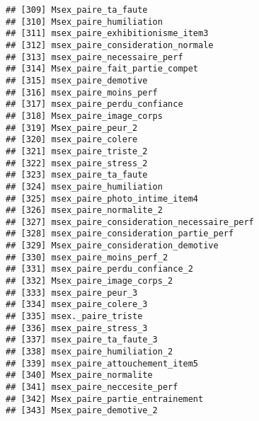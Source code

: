 \documentclass[
]{article}
\begin{document}
\begin{verbatim}
## [309] Msex_paire_ta_faute                                              
## [310] Msex_paire_humiliation                                           
## [311] msex_paire_exhibitionisme_item3                                  
## [312] msex_paire_consideration_normale                                 
## [313] msex_paire_necessaire_perf                                       
## [314] Msex_paire_fait_partie_compet                                    
## [315] msex_paire_demotive                                              
## [316] msex_paire_moins_perf                                            
## [317] msex_paire_perdu_confiance                                       
## [318] Msex_paire_image_corps                                           
## [319] Msex_paire_peur_2                                                
## [320] msex_paire_colere                                                
## [321] msex_paire_triste_2                                              
## [322] msex_paire_stress_2                                              
## [323] msex_paire_ta_faute                                              
## [324] msex_paire_humiliation                                           
## [325] msex_paire_photo_intime_item4                                    
## [326] msex_paire_normalite_2                                           
## [327] msex_paire_consideration_necessaire_perf                         
## [328] msex_paire_consideration_partie_perf                             
## [329] Msex_paire_consideration_demotive                                
## [330] msex_paire_moins_perf_2                                          
## [331] msex_paire_perdu_confiance_2                                     
## [332] Msex_paire_image_corps_2                                         
## [333] msex_paire_peur_3                                                
## [334] msex_paire_colere_3                                              
## [335] msex._paire_triste                                               
## [336] msex_paire_stress_3                                              
## [337] msex_paire_ta_faute_3                                            
## [338] msex_paire_humiliation_2                                         
## [339] msex_paire_attouchement_item5                                    
## [340] Msex_paire_normalite                                             
## [341] msex_paire_neccesite_perf                                        
## [342] Msex_paire_partie_entrainement                                   
## [343] Msex_paire_demotive_2                                            

\end{verbatim}
\end{document}
